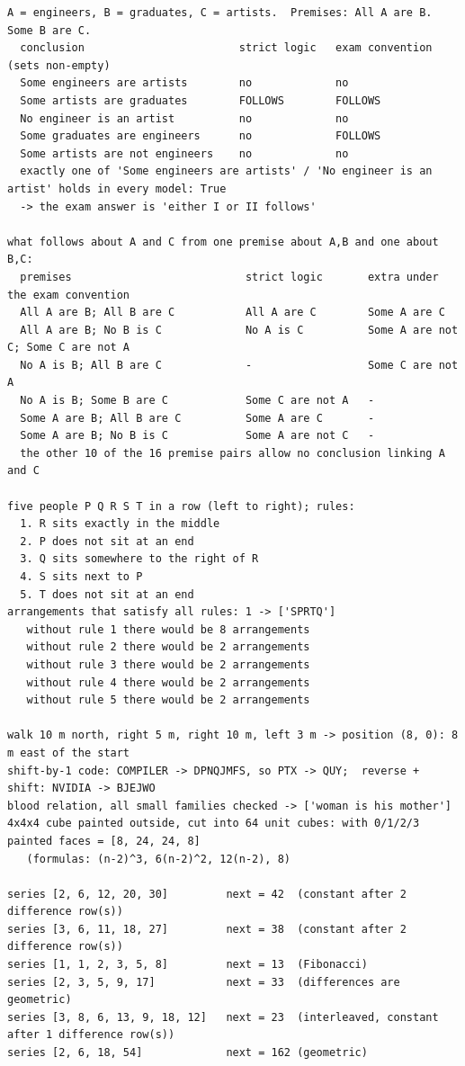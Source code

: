 \documentclass[10pt,a4paper,openany,oneside]{report}
\begin{document}
\begin{lstlisting}[style=out,basicstyle=\ttfamily\fontsize{7.2}{8.6}\selectfont,title={ap\_logic.py: output}]
A = engineers, B = graduates, C = artists.  Premises: All A are B.  Some B are C.
  conclusion                        strict logic   exam convention (sets non-empty)
  Some engineers are artists        no             no
  Some artists are graduates        FOLLOWS        FOLLOWS
  No engineer is an artist          no             no
  Some graduates are engineers      no             FOLLOWS
  Some artists are not engineers    no             no
  exactly one of 'Some engineers are artists' / 'No engineer is an artist' holds in every model: True
  -> the exam answer is 'either I or II follows'

what follows about A and C from one premise about A,B and one about B,C:
  premises                           strict logic       extra under the exam convention
  All A are B; All B are C           All A are C        Some A are C
  All A are B; No B is C             No A is C          Some A are not C; Some C are not A
  No A is B; All B are C             -                  Some C are not A
  No A is B; Some B are C            Some C are not A   -
  Some A are B; All B are C          Some A are C       -
  Some A are B; No B is C            Some A are not C   -
  the other 10 of the 16 premise pairs allow no conclusion linking A and C

five people P Q R S T in a row (left to right); rules:
  1. R sits exactly in the middle
  2. P does not sit at an end
  3. Q sits somewhere to the right of R
  4. S sits next to P
  5. T does not sit at an end
arrangements that satisfy all rules: 1 -> ['SPRTQ']
   without rule 1 there would be 8 arrangements
   without rule 2 there would be 2 arrangements
   without rule 3 there would be 2 arrangements
   without rule 4 there would be 2 arrangements
   without rule 5 there would be 2 arrangements

walk 10 m north, right 5 m, right 10 m, left 3 m -> position (8, 0): 8 m east of the start
shift-by-1 code: COMPILER -> DPNQJMFS, so PTX -> QUY;  reverse + shift: NVIDIA -> BJEJWO
blood relation, all small families checked -> ['woman is his mother']
4x4x4 cube painted outside, cut into 64 unit cubes: with 0/1/2/3 painted faces = [8, 24, 24, 8]
   (formulas: (n-2)^3, 6(n-2)^2, 12(n-2), 8)

series [2, 6, 12, 20, 30]         next = 42  (constant after 2 difference row(s))
series [3, 6, 11, 18, 27]         next = 38  (constant after 2 difference row(s))
series [1, 1, 2, 3, 5, 8]         next = 13  (Fibonacci)
series [2, 3, 5, 9, 17]           next = 33  (differences are geometric)
series [3, 8, 6, 13, 9, 18, 12]   next = 23  (interleaved, constant after 1 difference row(s))
series [2, 6, 18, 54]             next = 162 (geometric)
\end{lstlisting}
\end{document}
